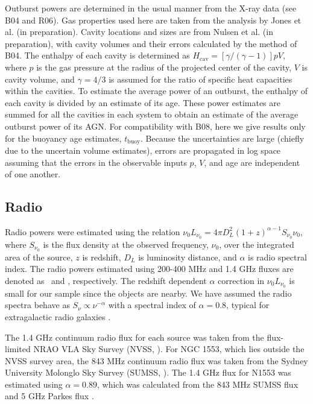 \documentclass{emulateapj}
\begin{document}
Outburst powers are determined in the usual manner from the X-ray data
(see B04 and R06). Gas properties used here are taken from the
analysis by Jones et al. (in preparation). Cavity locations and sizes
are from Nulsen et al. (in preparation), with cavity volumes and their
errors calculated by the method of B04. The enthalpy of each cavity is
determined as $H_{\mathrm{cav}} = [\gamma/(\gamma-1)] p V$, where $p$
is the gas pressure at the radius of the projected center of the
cavity, $V$ is cavity volume, and $\gamma = 4/3$ is assumed for the
ratio of specific heat capacities within the cavities. To estimate the
average power of an outburst, the enthalpy of each cavity is divided
by an estimate of its age. These power estimates are summed for all
the cavities in each system to obtain an estimate of the average
outburst power of its AGN. For compatibility with B08, here we give
results only for the buoyancy age estimates,
$t_{\mathrm{buoy}}$. Because the uncertainties are large (chiefly due
to the uncertain volume estimates), errors are propagated in log space
assuming that the errors in the observable inputs $p$, $V$, and age
are independent of one another.

\subsection{Radio}
\label{sec:radio}

Radio powers were estimated using the relation $\nu_0 L_{\nu_0} = 4
\pi D_L^2 (1+z)^{\alpha-1} S_{\nu_0} \nu_0$, where $S_{\nu_0}$ is the
flux density at the observed frequency, $\nu_0$, over the integrated
area of the source, $z$ is redshift, $D_L$ is luminosity distance, and
$\alpha$ is radio spectral index. The radio powers estimated using
200-400 MHz and 1.4 GHz fluxes are denoted as \plow\ and \phigh,
respectively. The redshift dependent $\alpha$ correction in $\nu_0
L_{\nu_0}$ is small for our sample since the objects are nearby. We
have assumed the radio spectra behave as $S_{\nu} \propto
\nu^{-\alpha}$ with a spectral index of $\alpha = 0.8$, typical for
extragalactic radio galaxies \citep{1992ARA&A..30..575C}.

The 1.4 GHz continuum radio flux for each source was taken from the
flux-limited NRAO VLA Sky Survey (NVSS, \citealt{nvss}). For NGC 1553,
which lies outside the NVSS survey area, the 843 MHz continuum radio
flux was taken from the Sydney University Molonglo Sky Survey (SUMSS,
\citealt{sumss1, sumss2}). The 1.4 GHz flux for N1553 was estimated
using $\alpha = 0.89$, which was calculated from the 843 MHz SUMSS
flux and 5 GHz Parkes flux \citep{1970ApL.....5...29W}.
\end{document}
